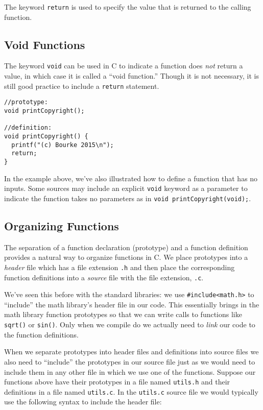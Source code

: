 The keyword \texttt{return} is used to specify the value
that is returned to the calling function.

\subsection{Void Functions}

The keyword \texttt{void} can be used in C to indicate
a function does \emph{not} return a value, in which case it is
called a ``void function.''  Though it is not necessary, it is still
good practice to include a \texttt{return} statement.

\begin{verbatim}
//prototype:
void printCopyright();

//definition:
void printCopyright() {
  printf("(c) Bourke 2015\n");
  return;
}
\end{verbatim}

In the example above, we've also illustrated how to define a 
function that has no inputs.  Some sources may include an 
explicit \texttt{void} keyword as a parameter to indicate
the function takes no parameters as in \texttt{void printCopyright(void);}.

\subsection{Organizing Functions}

The separation of a function declaration (prototype) and a function definition
provides a natural way to organize functions in C.  We place 
prototypes into a \emph{header} file which has a file extension
\texttt{.h} and then place the corresponding function
definitions into a \emph{source} file with the file extension, 
\texttt{.c}.

We've seen this before with the standard libraries: we use
\texttt{#include<math.h>} to ``include'' the math library's
header file in our code.  This essentially brings in the math
library function prototypes so that we can write calls to functions
like 
\texttt{sqrt()} or \texttt{sin()}.  Only when we compile 
do we actually need to \emph{link} our code to the function definitions.

When we separate prototypes into header files and definitions into
source files we also need to ``include'' the prototypes in our source file
just as we would need to include them in any other file in which we
use one of the functions.  Suppose our functions above have their
prototypes in a file named \texttt{utils.h} and their definitions
in a file named \texttt{utils.c}.  In the \texttt{utils.c}
source file we would typically use the following syntax to include
the header file:

